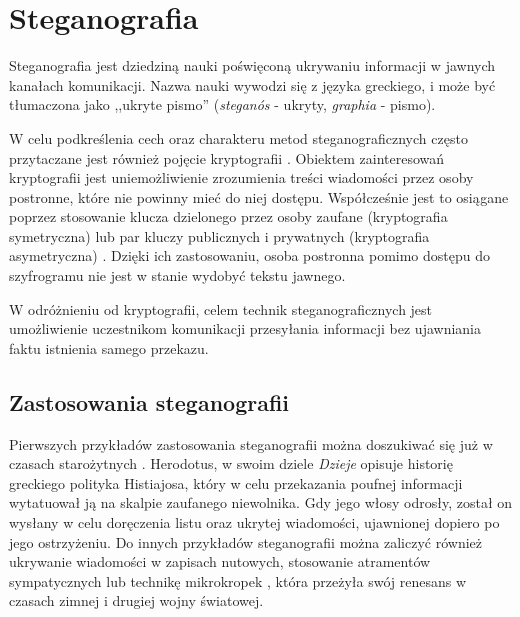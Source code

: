 
\chapter{Steganografia}\label{chap:steganography}
{

    Steganografia jest dziedziną nauki poświęconą ukrywaniu informacji w jawnych kanałach komunikacji. Nazwa nauki
    wywodzi się z języka greckiego, i może być tłumaczona jako ,,ukryte pismo'' (\textit{steganós} - ukryty,
    \textit{graphia} - pismo).

    W celu podkreślenia cech oraz charakteru metod steganograficznych często przytaczane jest również pojęcie
    kryptografii  \cite{Petitcolas1999InformationHS, Pope2012DigitalS, Sharma2020AnIS}. Obiektem zainteresowań
    kryptografii jest uniemożliwienie zrozumienia treści wiadomości przez osoby postronne, które nie powinny mieć do
    niej dostępu. Współcześnie jest to osiągane poprzez stosowanie klucza dzielonego przez osoby zaufane (kryptografia
    symetryczna) lub par kluczy publicznych i prywatnych (kryptografia asymetryczna) \cite{Menezes1996HandbookOA,
    Santoso2018SystematicLR}. Dzięki ich zastosowaniu, osoba postronna pomimo dostępu do szyfrogramu nie jest w stanie
    wydobyć tekstu jawnego.

    W odróżnieniu od kryptografii, celem technik steganograficznych jest umożliwienie uczestnikom komunikacji
    przesyłania informacji bez ujawniania faktu istnienia samego przekazu.

    \section{Zastosowania steganografii}
    {
        Pierwszych przykładów zastosowania steganografii można doszukiwać się już w czasach
        starożytnych \cite{Petitcolas1999InformationHS}. Herodotus, w swoim dziele \textit{Dzieje} opisuje historię
        greckiego polityka Histiajosa, który w celu przekazania poufnej informacji wytatuował ją na skalpie zaufanego
        niewolnika. Gdy jego włosy odrosły, został on wysłany w celu doręczenia listu oraz ukrytej wiadomości,
        ujawnionej dopiero po jego ostrzyżeniu. Do innych
        przykładów steganografii można zaliczyć również ukrywanie wiadomości w zapisach nutowych, stosowanie atramentów
        sympatycznych lub technikę mikrokropek \cite{Petitcolas1999InformationHS}, która przeżyła swój renesans w czasach
        zimnej i drugiej wojny światowej.

}}
